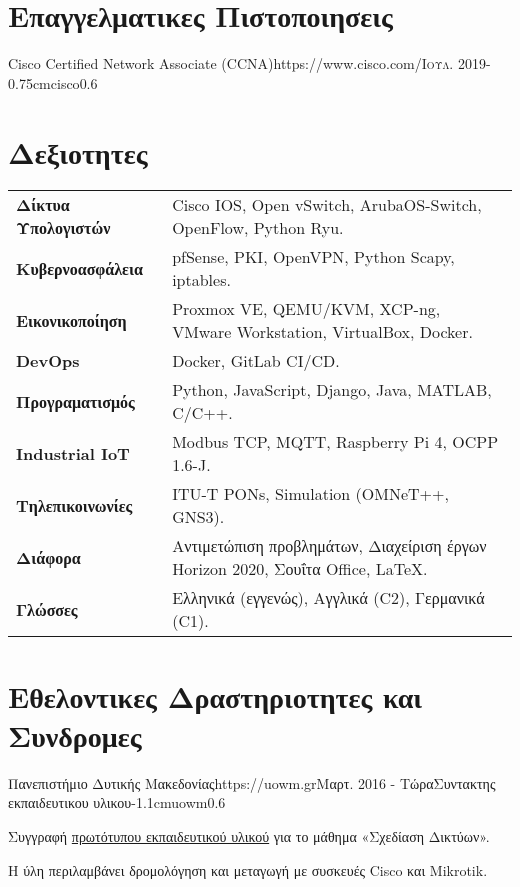 \documentclass{mycv}
\begin{document}
	\vspace*{0.75cm}	

	
	\section{Επαγγελματικες Πιστοποιησεις}
	\begin{EntryDatedLogo}{Cisco Certified Network Associate (CCNA)}{https://www.cisco.com/}{\scshape{Ιουλ. 2019}}{}{-0.75cm}{cisco}{0.6}
	\end{EntryDatedLogo}
	\vspace{0.25cm}
	
	\section{Δεξιοτητες}
	\begin{tabular}{m{4.5cm} m{13cm}}\renewcommand{\arraystretch}{2}
		\textbf{Δίκτυα Υπολογιστών}   	& Cisco IOS, Open vSwitch, ArubaOS-Switch, OpenFlow, Python Ryu.\\
		\textbf{Κυβερνοασφάλεια}		& pfSense, PKI, OpenVPN, Python Scapy, iptables. \\
		\textbf{Εικονικοποίηση}			& Proxmox VE, QEMU/KVM, XCP-ng, VMware Workstation, VirtualBox, Docker.\\ 
		\textbf{DevOps}					& Docker, GitLab CI/CD. \\
		\textbf{Προγραματισμός}	    	& Python, JavaScript, Django, Java, MATLAB, C/C++. \\
		\textbf{Industrial IoT}			& Modbus TCP, MQTT, Raspberry Pi 4, OCPP 1.6-J.\\
		\textbf{Τηλεπικοινωνίες}   		& ITU-T PONs, Simulation (OMNeT++, GNS3). \\
		\textbf{Διάφορα}				& Αντιμετώπιση προβλημάτων, Διαχείριση έργων Horizon 2020, Σουΐτα Office, \LaTeX. \\
		\textbf{Γλώσσες} 				& Ελληνικά (εγγενώς), Αγγλικά (C2), Γερμανικά (C1).
	\end{tabular}

	\section{Εθελοντικες Δραστηριοτητες και Συνδρομες}
	\vspace*{0.125cm}	
	\begin{EntryDatedLogo}{Πανεπιστήμιο Δυτικής Μακεδονίας}{https://uowm.gr}{Μαρτ. 2016 - Τώρα}{Συντακτης εκπαιδευτικου υλικου}{-1.1cm}{uowm}{0.6}
		\begin{Itemize}
			\item Συγγραφή \href{https://github.com/cdalamagkas/network-design-labs}{πρωτότυπου εκπαιδευτικού υλικού} για το μάθημα «Σχεδίαση Δικτύων».
			\item Η ύλη περιλαμβάνει δρομολόγηση και μεταγωγή με συσκευές Cisco και Mikrotik.
		\end{Itemize}
	\end{EntryDatedLogo}
	
\end{document}
